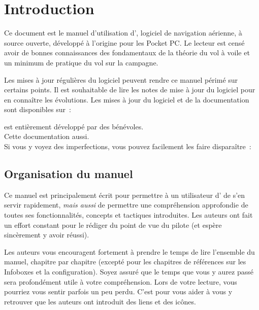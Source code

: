 
\chapter{Introduction}\label{cha:introduction}
Ce document est le manuel d'utilisation d'\xc, logiciel de navigation aérienne, à source ouverte, développé à l'origine pour les Pocket PC. Le lecteur est censé avoir de bonnes connaissances des fondamentaux de la théorie du vol à voile et un minimum de pratique du vol sur la campagne.

Les mises à jour régulières du logiciel peuvent rendre ce manuel périmé sur certains points. Il est souhaitable de lire les notes de mise à jour du logiciel pour en connaître les évolutions. Les mises à jour du logiciel et de la documentation sont disponibles sur~:
\begin{quote}
\end{quote}

\begin{framed}
	\begin{center}
		\xc{} est entièrement développé par des bénévoles.\\
		Cette documentation aussi.\\
		Si vous y voyez des imperfections, vous pouvez facilement les faire disparaître~:\\
	\end{center}
\end{framed}

\section{Organisation du manuel}

Ce manuel est principalement écrit pour permettre à un utilisateur d'\xc{} de s'en servir
rapidement, \emph{mais aussi} de permettre une compréhension approfondie de toutes ses fonctionnalités,
concepts et tactiques introduites. Les auteurs ont fait un effort constant
pour le rédiger du point de vue du pilote (et espère sincèrement y avoir réussi).

Les auteurs vous encouragent fortement à prendre le temps de lire l'ensemble du manuel,
chapitre par chapitre (excepté pour les chapitres de références sur les Infoboxes et 
la configuration). Soyez assuré que le temps que vous y aurez passé sera profondément
utile à votre compréhension. Lors de votre lecture, vous pourriez vous sentir parfois un peu perdu.
C'est pour vous aider à vous y retrouver que les auteurs ont introduit des liens et des icônes.

